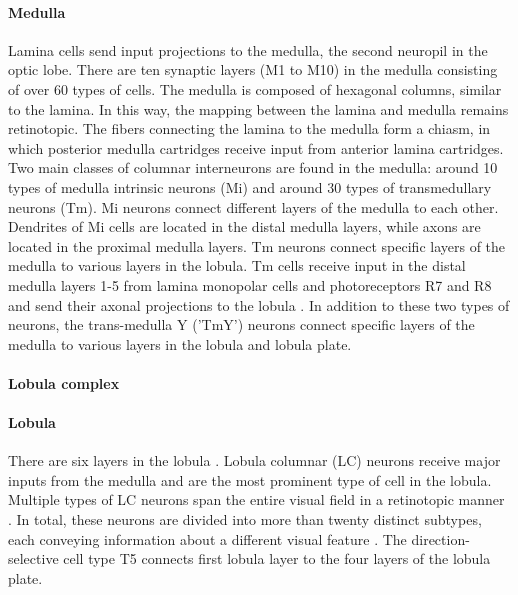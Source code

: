 \paragraph{Medulla}
Lamina cells send input projections to the medulla, the second neuropil in the optic lobe. There are ten synaptic layers (M1 to M10) in the medulla consisting of over 60 types of cells. The medulla is composed of hexagonal columns, similar to the lamina. In this way, the mapping between the lamina and medulla remains retinotopic. The fibers connecting the lamina to the medulla form a chiasm, in which posterior medulla cartridges receive input from anterior lamina cartridges. Two main classes of columnar interneurons are found in the medulla: around 10 types of medulla intrinsic neurons (Mi) and around 30 types of transmedullary neurons (Tm). Mi neurons connect different layers of the medulla to each other. Dendrites of Mi cells are located in the distal medulla layers, while axons are located in the proximal medulla layers. Tm neurons connect specific layers of the medulla to various layers in the lobula. Tm cells receive input in the distal medulla layers 1-5 from lamina monopolar cells and photoreceptors R7 and R8 and send their axonal projections to the lobula \parencite{Fischbach1989, Takemura2011}. In addition to these two types of neurons, the trans-medulla Y ('TmY') neurons connect specific layers of the medulla to various layers in the lobula and lobula plate.

\paragraph{Lobula complex}

\paragraph{Lobula}
There are six layers in the lobula \parencite{Fischbach1989}. Lobula columnar (LC) neurons receive major inputs from the medulla and are the most prominent type of cell in the lobula. Multiple types of LC neurons span the entire visual field in a retinotopic manner \parencite{Otsuna2006}. In total, these neurons are divided into more than twenty distinct subtypes, each conveying information about a different visual feature \parencite{Wu2016}. The direction-selective cell type T5 connects first lobula layer to the four layers of the lobula plate.

